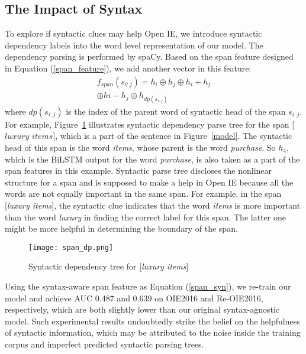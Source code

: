 \documentclass[letterpaper]{article} \usepackage{aaai20}  \usepackage{times}  \usepackage{helvet} \usepackage{courier}  \usepackage[hyphens]{url}  \urlstyle{rm} \def\UrlFont{\rm}  \usepackage{graphicx}  \frenchspacing  \setlength{\pdfpagewidth}{8.5in}  \setlength{\pdfpageheight}{11in}
\begin{document}
\subsection{The Impact of Syntax}
To explore if syntactic clues may help Open IE, we introduce syntactic dependency labels into the word level representation of our model. The dependency parsing is performed by spaCy. Based on the span feature designed in Equation (\ref{span_feature}), we add another vector in this feature: 
\begin{equation}
    \label{span_syn}
    \begin{split}
        f_{span}(s_{i:j}) = h_i \oplus h_j \oplus h_i + h_j\\
         \oplus hi - h_j \oplus h_{dp(s_{i:j})}
    \end{split}
\end{equation}
where $dp(s_{i:j})$ is the index of the parent word of syntactic head of the span $s_{i:j}$. For example, Figure~\ref{dp_span} illustrates syntactic dependency parse tree for the span [$luxury$ $items$], which is a part of the sentence in Figure~\ref{model}. The syntactic head of this span is the word \emph{items}, whose parent is the word \emph{purchase}. So $h_4$, which is the BiLSTM output for the word \emph{purchase}, is also taken as a part of the span features in this example. Syntactic parse tree discloses the nonlinear structure for a span and is supposed to make a help in Open IE because all the words are not equally important in the same span. For example, in the span [\emph{luxury items}], the syntactic clue indicates that the word \emph{items} is more important than the word \emph{luxury} in finding the correct label for this span. The latter one might be more helpful in determining the boundary of the span.

\begin{figure}[ht]
\begin{center}
\rule[-.5cm]{0cm}{0cm}\texttt{[image: span\_dp.png]}\rule[-.5cm]{0cm}{0cm}
\caption{Syntactic dependency tree for [\emph{luxury items}]}
\label{dp_span}
\end{center}
\end{figure}

Using the syntax-aware span feature as Equation (\ref{span_syn}), we re-train our model and achieve AUC 0.487 and 0.639 on OIE2016 and Re-OIE2016, respectively, which are both slightly lower than our original syntax-agnostic model. Such experimental results undoubtedly strike the belief on the helpfulness of syntactic information, which may be attributed to the noise inside the training corpus and imperfect predicted syntactic parsing trees. 
\end{document}
